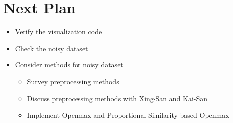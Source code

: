 \documentclass[dvipdfmx]{article}
\begin{document}
\section{Next Plan}
\begin{itemize}
    \item Verify the visualization code
    \item Check the noisy dataset
    \item Consider methods for noisy dataset
    \begin{itemize}
        \item Survey preprocessing methods
        \item Discuss preprocessing methods with Xing-San and Kai-San
        \item Implement Openmax and Proportional Similarity-based Openmax
    \end{itemize}
\end{itemize}
\end{document}
